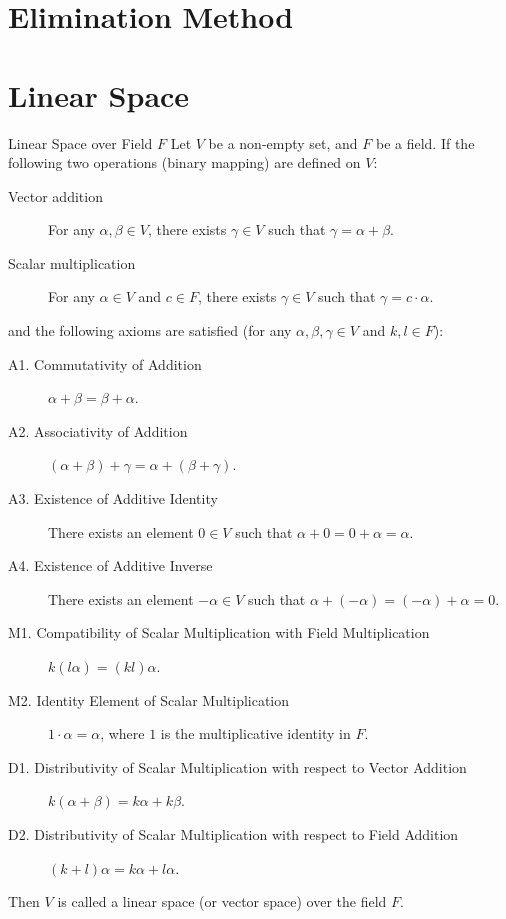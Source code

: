 \documentclass[11pt]{../../TexTemplate/elegantbook} %
\begin{document}
\section{Elimination Method}
\section{Linear Space}
\begin{definition}{Linear Space over Field \(F\)}
    Let \( V \) be a non-empty set, and \( F \) be a field.
    If the following two operations (binary mapping) are defined on \( V \):
    \begin{description}
        \item [Vector addition] For any \( \alpha, \beta \in V \), 
            there exists \( \gamma \in V \) such that \( \gamma = \alpha + \beta \).
        \item [Scalar multiplication] For any \( \alpha \in V \) and \( c \in F \), 
            there exists \( \gamma \in V \) such that \( \gamma = c \cdot \alpha \).
    \end{description}
    and the following axioms are satisfied (for any \( \alpha, \beta, \gamma \in V \) and \( k, l \in F \)):
    \begin{description}
        \item [A1. Commutativity of Addition] \( \alpha + \beta = \beta + \alpha \).
        \item [A2. Associativity of Addition] \( (\alpha + \beta) + \gamma = \alpha + (\beta + \gamma) \).
        \item [A3. Existence of Additive Identity] There exists an element \( 0 \in V \) such that 
            \( \alpha + 0 = 0 + \alpha = \alpha \).
        \item [A4. Existence of Additive Inverse] There exists an element 
            \( -\alpha \in V \) such that \( \alpha + (-\alpha) = (-\alpha) + \alpha = 0 \).
        \item [M1. Compatibility of Scalar Multiplication with Field Multiplication] \( k(l\alpha) = (kl)\alpha\).
        \item [M2. Identity Element of Scalar Multiplication] \( 1\cdot\alpha = \alpha\), where \( 1\) is the multiplicative identity in \( F\).
        \item [D1. Distributivity of Scalar Multiplication with respect to Vector Addition] 
            \( k(\alpha + \beta) = k\alpha + k\beta\).
        \item [D2. Distributivity of Scalar Multiplication with respect to Field Addition] \( (k+l)\alpha = k\alpha + l\alpha\).
    \end{description}
    Then \( V \) is called a linear space (or vector space) over the field \( F \).
\end{definition}
\end{document}
